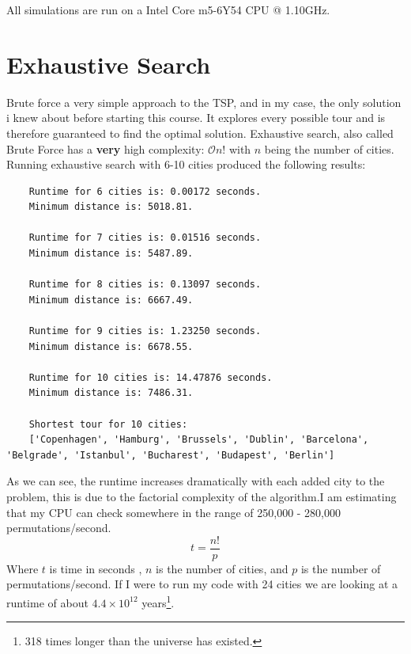 \documentclass[a4paper, norsk, 12pt]{article}
\begin{document}
All simulations are run on a Intel Core m5-6Y54 CPU @ 1.10GHz.
 

\section{Exhaustive Search}
Brute force a very simple approach to the TSP, and in my case, the only solution i knew about before starting this course. It explores every possible tour and is therefore guaranteed to find the optimal solution. Exhaustive search, also called Brute Force has a \textbf{very} high complexity: $\mathcal{O}{n!}$ with $n$ being the number of cities. 
\newline \newline 
Running exhaustive search with 6-10 cities produced the following results: 
	\begin{lstlisting}
	Runtime for 6 cities is: 0.00172 seconds.
	Minimum distance is: 5018.81.
	
	Runtime for 7 cities is: 0.01516 seconds.
	Minimum distance is: 5487.89.
		
	Runtime for 8 cities is: 0.13097 seconds.
	Minimum distance is: 6667.49.
	
	Runtime for 9 cities is: 1.23250 seconds.
	Minimum distance is: 6678.55.

	Runtime for 10 cities is: 14.47876 seconds.
	Minimum distance is: 7486.31.

	Shortest tour for 10 cities:
	['Copenhagen', 'Hamburg', 'Brussels', 'Dublin', 'Barcelona', 'Belgrade', 'Istanbul', 'Bucharest', 'Budapest', 'Berlin']
	\end{lstlisting}
As we can see, the runtime increases dramatically with each added city to the problem, this is due to the factorial complexity of the algorithm.I am estimating that my CPU can check somewhere in the range of 250,000 - 280,000 permutations/second. 
\[ 
	t =  \frac{n!}{p}
\]
Where $t$ is time in seconds , $n$ is the number of cities, and $p$ is the number of permutations/second. 
If I were to run my code with 24 cities we are looking at a runtime of about $4.4\times 10^{12}$ years\footnote{318 times longer than the universe has existed.}.
\end{document}
